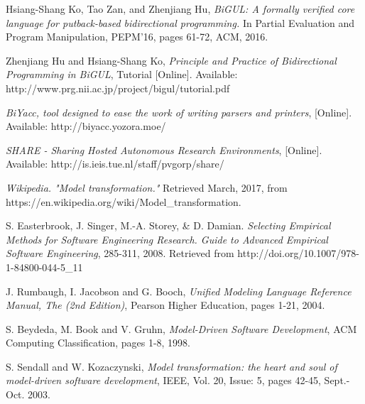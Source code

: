 \begin{thebibliography}{1}
	 Hsiang-Shang Ko, Tao Zan, and Zhenjiang Hu, {\em BiGUL: A formally verified core language for putback-based bidirectional programming.} In Partial Evaluation and Program Manipulation, PEPM'16, pages 61-72, ACM, 2016.
	
	 Zhenjiang Hu and Hsiang-Shang Ko,  {\em Principle and Practice of Bidirectional Programming in BiGUL}, Tutorial [Online]. Available: http://www.prg.nii.ac.jp/project/bigul/tutorial.pdf
	
	 {\em BiYacc, tool designed to ease the work of writing parsers and printers}, [Online]. Available: http://biyacc.yozora.moe/
	
	 {\em SHARE - Sharing Hosted Autonomous Research Environments}, [Online]. Available: http://is.ieis.tue.nl/staff/pvgorp/share/
	
	 {\em Wikipedia. "Model transformation."} Retrieved March, 2017, from https://en.wikipedia.org/wiki/Model{\_}transformation.
	
	 S. Easterbrook, J. Singer, M.-A. Storey, \& D. Damian. {\em Selecting Empirical Methods for Software Engineering Research. Guide to Advanced Empirical Software Engineering}, 285-311, 2008. Retrieved from http://doi.org/10.1007/978-1-84800-044-5\_11
	
	 J. Rumbaugh, I. Jacobson and G. Booch, {\em Unified Modeling Language Reference Manual, The (2nd Edition)}, Pearson Higher Education, pages 1-21, 2004.
	
	 S. Beydeda, M. Book and V. Gruhn, {\em Model-Driven Software Development}, ACM Computing Classification, pages 1-8, 1998.
	
	 S. Sendall and W. Kozaczynski, {\em Model transformation: the heart and soul of model-driven software development},  IEEE, Vol. 20, Issue: 5, pages 42-45, Sept.-Oct. 2003.
	
	
\end{thebibliography}



